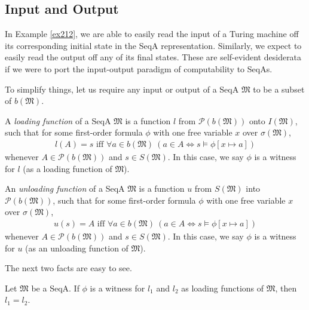 \documentclass[12pt]{article}
\numberwithin{equation}{section}
\begin{document}
\subsection{Input and Output}\label{ss250}

In Example \ref{ex212}, we are able to easily read the input of a Turing machine off its corresponding initial state in the SeqA representation. Similarly, we expect to easily read the output off any of its final states. These are self-evident desiderata if we were to port the input-output paradigm of computability to SeqAs. 

To simplify things, let us require any input or output of a SeqA $\mathfrak{M}$ to be a subset of $b(\mathfrak{M})$.

\begin{defi}
A \emph{loading function} of a SeqA $\mathfrak{M}$ is a function $l$ from $\mathcal{P}(b(\mathfrak{M}))$ onto $I(\mathfrak{M})$, such that for some first-order formula $\phi$ with one free variable $x$ over $\sigma(\mathfrak{M})$,
\begin{align*}
    l(A) = s \text{ iff } \forall a \in b(\mathfrak{M}) \ (a \in A \iff s \models \phi[x \mapsto a])
\end{align*}
whenever $A \in \mathcal{P}(b(\mathfrak{M}))$ and $s \in S(\mathfrak{M})$. In this case, we say $\phi$ is a witness for $l$ (as a loading function of $\mathfrak{M}$).
\end{defi}

\begin{defi}
An \emph{unloading function} of a SeqA $\mathfrak{M}$ is a function $u$ from $S(\mathfrak{M})$ into $\mathcal{P}(b(\mathfrak{M}))$, such that for some first-order formula $\phi$ with one free variable $x$ over $\sigma(\mathfrak{M})$,
\begin{align*}
    u(s) = A \text{ iff } \forall a \in b(\mathfrak{M}) \ (a \in A \iff s \models \phi[x \mapsto a])
\end{align*}
whenever $A \in \mathcal{P}(b(\mathfrak{M}))$ and $s \in S(\mathfrak{M})$. In this case, we say $\phi$ is a witness for $u$ (as an unloading function of $\mathfrak{M}$).
\end{defi}

The next two facts are easy to see.

\begin{fact}\label{fact215}
Let $\mathfrak{M}$ be a SeqA. If $\phi$ is a witness for $l_1$ and $l_2$ as loading functions of $\mathfrak{M}$, then $l_1 = l_2$.
\end{fact}
\end{document}
